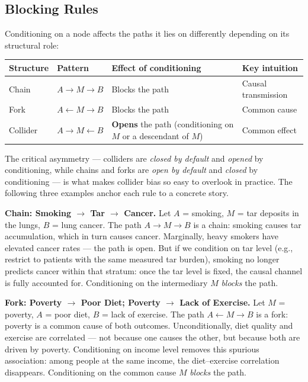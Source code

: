 \documentclass[master.tex]{subfiles}
\begin{document}
\subsection{Blocking Rules}

Conditioning on a node affects the paths it lies on differently depending on
its structural role:

\begin{center}
\renewcommand{\arraystretch}{1.35}
\begin{tabular}{@{}llp{5.8cm}p{4.0cm}@{}}
\toprule
\textbf{Structure} & \textbf{Pattern} & \textbf{Effect of conditioning} & \textbf{Key intuition} \\
\midrule
Chain    & $A \to M \to B$    & Blocks the path & Causal transmission \\
Fork     & $A \leftarrow M \to B$ & Blocks the path & Common cause \\
Collider & $A \to M \leftarrow B$ & \textbf{Opens} the path (conditioning on $M$ or a descendant of $M$) & Common effect \\
\bottomrule
\end{tabular}
\end{center}

\medskip
The critical asymmetry --- colliders are \emph{closed by default} and
\emph{opened} by conditioning, while chains and forks are \emph{open by
default} and \emph{closed} by conditioning --- is what makes collider bias
so easy to overlook in practice.  The following three examples anchor each
rule to a concrete story.

\medskip
\noindent\textbf{Chain: Smoking $\to$ Tar $\to$ Cancer.}
Let $A$ = smoking, $M$ = tar deposits in the lungs, $B$ = lung cancer.
The path $A \to M \to B$ is a chain: smoking causes tar accumulation, which
in turn causes cancer.
Marginally, heavy smokers have elevated cancer rates --- the path is open.
But if we condition on tar level (e.g., restrict to patients with the same
measured tar burden), smoking no longer predicts cancer within that stratum:
once the tar level is fixed, the causal channel is fully accounted for.
Conditioning on the intermediary $M$ \emph{blocks} the path.

\medskip
\noindent\textbf{Fork: Poverty $\to$ Poor Diet; Poverty $\to$ Lack of Exercise.}
Let $M$ = poverty, $A$ = poor diet, $B$ = lack of exercise.
The path $A \leftarrow M \to B$ is a fork: poverty is a common cause of
both outcomes.
Unconditionally, diet quality and exercise are correlated --- not
because one causes the other, but because both are driven by poverty.
Conditioning on income level removes this spurious association: among people
at the same income, the diet--exercise correlation disappears.
Conditioning on the common cause $M$ \emph{blocks} the path.
\end{document}
